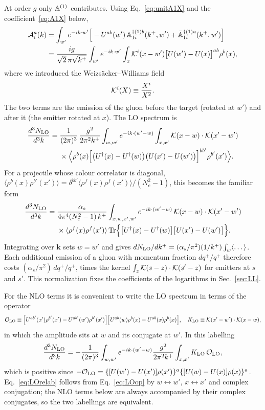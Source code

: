 At order $g$ only $\mathbb{A}^{(1)}$ contributes. Using Eq.~\eqref{eq:unitA1X} and the coefficient~\eqref{eq:A1X} below,
\begin{align}
\mathcal A^a_i(k)&=\int_{w'}e^{-ik\cdot w'}\Big[-U^{ab}(w')\,\mathbb{A}^{\dagger(1)b}_{1i}(k^+,w')+\bar{\mathbb{A}}^{\dagger(1)a}_{1i}(k^+,w')\Big]\notag\\
&=\frac{ig}{\sqrt2\,\pi\sqrt{k^+}}\int_{w'}e^{-ik\cdot w'}\int_x\mathcal{K}^i(x-w')\big[U(w')-U(x)\big]^{ab}\rho^b(x),
\label{eq:ampLO}
\end{align}
where we introduced the Weizs\"acker--Williams field
\begin{equation}
\mathcal{K}^i(X)\equiv\frac{X^i}{X^2}.
\end{equation}
The two terms are the emission of the gluon before the target (rotated at $w'$) and after it (the emitter rotated at $x$). The LO spectrum is
\begin{align}
\frac{d^3N_{\rm LO}}{d^3k}={}&\frac{1}{(2\pi)^3}\,\frac{g^2}{2\pi^2k^+}\int_{w,w'}e^{-ik\cdot(w'-w)}\int_{x,x'}\mathcal{K}(x-w)\cdot\mathcal{K}(x'-w')\notag\\
&\times\Big\langle\rho^b(x)\Big[\big(U^{\dagger}(x)-U^{\dagger}(w)\big)\big(U(x')-U(w')\big)\Big]^{bb'}\rho^{b'}(x')\Big\rangle.
\label{eq:LOop}
\end{align}
For a projectile whose colour correlator is diagonal, $\langle\rho^b(x)\rho^{b'}(x')\rangle=\delta^{bb'}\langle\rho^f(x)\rho^f(x')\rangle/(N_c^2-1)$, this becomes the familiar form~\cite{Kovchegov:2001sc,Dumitru:2001ux,Blaizot:2004wu}
\begin{align}
\frac{d^3N_{\rm LO}}{d^3k}={}&\frac{\alpha_s}{4\pi^4(N_c^2-1)\,k^+}\int_{x,w,x',w'}e^{-ik\cdot(w'-w)}\,\mathcal{K}(x-w)\cdot\mathcal{K}(x'-w')\notag\\
&\times\langle\rho^f(x)\rho^f(x')\rangle\,\mathrm{Tr}\Big\{\big[U^{\dagger}(x)-U^{\dagger}(w)\big]\big[U(x')-U(w')\big]\Big\}.
\label{eq:LO}
\end{align}
Integrating over $\mathbf k$ sets $w=w'$ and gives $dN_{\rm LO}/dk^+=(\alpha_s/\pi^2)(1/k^+)\int_w\langle\dots\rangle$. Each additional emission of a gluon with momentum fraction $dq^+/q^+$ therefore costs $(\alpha_s/\pi^2)\,dq^+/q^+$, times the kernel $\int_z\mathcal{K}(s-z)\cdot\mathcal{K}(s'-z)$ for emitters at $s$ and $s'$. This normalization fixes the coefficients of the logarithms in Sec.~\ref{sec:LL}.

For the NLO terms it is convenient to write the LO spectrum in terms of the operator
\begin{equation}
\mathcal{O}_{\rm LO}\equiv\Big[U^{ab'}(x')\rho^{b'}(x')-U^{ab'}(w')\rho^{b'}(x')\Big]\Big[U^{ab}(w)\rho^b(x)-U^{ab}(x)\rho^b(x)\Big],\quad K_{\rm LO}\equiv\mathcal{K}(x'-w')\cdot\mathcal{K}(x-w),
\label{eq:OLO}
\end{equation}
in which the amplitude sits at $w$ and its conjugate at $w'$. In this labelling
\begin{equation}
\frac{d^3N_{\rm LO}}{d^3k}=-\frac{1}{(2\pi)^3}\int_{w,w'}e^{-ik\cdot(w'-w)}\frac{g^2}{2\pi^2k^+}\int_{x,x'}K_{\rm LO}\,\mathcal{O}_{\rm LO},
\label{eq:LOrelab}
\end{equation}
which is positive since $-\mathcal{O}_{\rm LO}=\{[U(w')-U(x')]\rho(x')\}^a\{[U(w)-U(x)]\rho(x)\}^a$. Eq.~\eqref{eq:LOrelab} follows from Eq.~\eqref{eq:LOop} by $w\leftrightarrow w'$, $x\leftrightarrow x'$ and complex conjugation; the NLO terms below are always accompanied by their complex conjugates, so the two labellings are equivalent.
